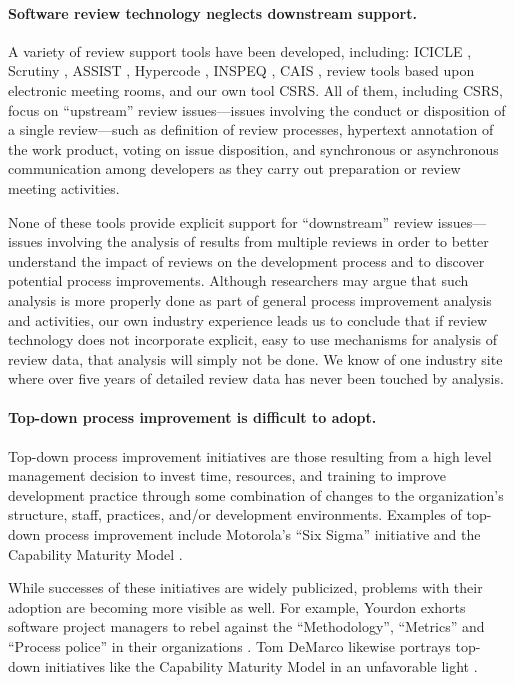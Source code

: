 \paragraph{Software review technology neglects downstream support.} 

A variety of review support tools have been developed, including:
ICICLE \cite{Brothers90,Sembugamoorthy90}, Scrutiny \cite{Gintell92,Gintell93,Gintell94}, ASSIST \cite{Macdonald97},
Hypercode \cite{Perry96,Perpich97}, INSPEQ \cite{Knight91,Knight93}, CAIS
\cite{Mashayekhi93,Mashayekhi94}, review tools based upon electronic
meeting rooms,  and our own tool CSRS. All of them,
including CSRS, focus on ``upstream'' review issues---issues involving
the conduct or disposition of a single review---such as definition of
review processes, hypertext annotation of the work product, voting on issue
disposition, and synchronous or asynchronous communication among developers
as they carry out preparation or review meeting activities.

None of these tools provide explicit support for ``downstream'' review
issues---issues involving the analysis of results from multiple reviews in
order to better understand the impact of reviews on the development process
and to discover potential process improvements. Although researchers may
argue that such analysis is more properly done as part of general process
improvement analysis and activities, our own industry experience leads us
to conclude that if review technology does not incorporate explicit, easy
to use mechanisms for analysis of review data, that analysis will simply
not be done. We know of one industry site where over five years of detailed
review data has never been touched by analysis.

\paragraph{Top-down process improvement is difficult to adopt.} 

Top-down process improvement initiatives are those resulting from a high
level management decision to invest time, resources, and training to
improve development practice through some combination of changes to the
organization's structure, staff, practices, and/or development
environments. Examples of top-down process improvement include Motorola's
``Six Sigma'' initiative and the Capability Maturity Model \cite{Paulk95}.  

While successes of these initiatives are widely publicized, problems with
their adoption are becoming more visible as well.  For example, Yourdon
exhorts software project managers to rebel against the ``Methodology'',
``Metrics'' and ``Process police'' in their organizations \cite{Yourdon97}.
Tom DeMarco likewise portrays top-down initiatives like the Capability
Maturity Model in an unfavorable light \cite{DeMarco97}.  

